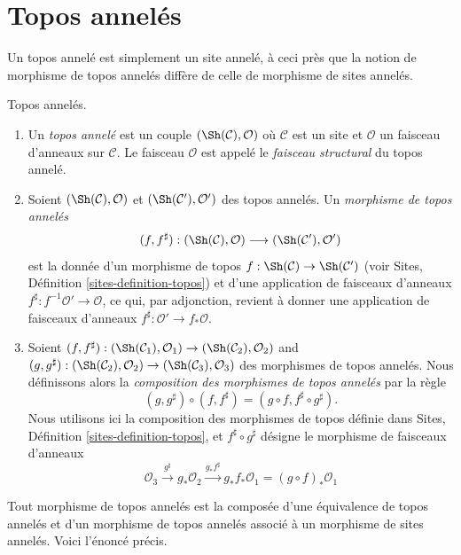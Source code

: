 \section{Topos annelés}
\label{section-ringed-topoi}

\noindent
Un topos annelé est simplement un site annelé, à ceci près que la notion de
morphisme de topos annelés diffère de celle de morphisme de sites annelés.

\begin{definition}
\label{definition-ringed-topos}
Topos annelés.
\begin{enumerate}
\item Un {\it topos annelé} est un couple
$(\Sh(\mathcal{C}), \mathcal{O})$
où $\mathcal{C}$ est un site et $\mathcal{O}$ un faisceau d'anneaux sur
$\mathcal{C}$. Le faisceau $\mathcal{O}$ est appelé le {\it faisceau
structural} du topos annelé.
\item Soient $(\Sh(\mathcal{C}), \mathcal{O})$ et
$(\Sh(\mathcal{C}'), \mathcal{O}')$ des topos annelés. Un {\it morphisme de
topos annelés}
$$
(f, f^\sharp) :
(\Sh(\mathcal{C}), \mathcal{O})
\longrightarrow
(\Sh(\mathcal{C}'), \mathcal{O}')
$$
est la donnée d'un morphisme de topos
$f : \Sh(\mathcal{C}) \to \Sh(\mathcal{C}')$ (voir Sites, Définition
\ref{sites-definition-topos}) et d'une application de faisceaux d'anneaux
$f^\sharp : f^{-1}\mathcal{O}' \to \mathcal{O}$, ce qui, par adjonction,
revient à donner une application de faisceaux d'anneaux
$f^\sharp : \mathcal{O}' \to f_*\mathcal{O}$.
\item Soient
$(f, f^\sharp) :
(\Sh(\mathcal{C}_1), \mathcal{O}_1)
\to (\Sh(\mathcal{C}_2), \mathcal{O}_2)$ and
$(g, g^\sharp) :
(\Sh(\mathcal{C}_2), \mathcal{O}_2) \to
(\Sh(\mathcal{C}_3), \mathcal{O}_3)$
des morphismes de topos annelés. Nous définissons alors la {\it composition des
morphismes de topos annelés} par la règle
$$
(g, g^\sharp) \circ (f, f^\sharp) = (g \circ f, f^\sharp \circ g^\sharp).
$$
Nous utilisons ici la composition des morphismes de topos définie dans Sites,
Définition \ref{sites-definition-topos}, et $f^\sharp \circ g^\sharp$ désigne
le morphisme de faisceaux d'anneaux
$$
\mathcal{O}_3 \xrightarrow{g^\sharp} g_*\mathcal{O}_2
\xrightarrow{g_*f^\sharp} g_*f_*\mathcal{O}_1 = (g \circ f)_*\mathcal{O}_1
$$
\end{enumerate}
\end{definition}

\noindent
Tout morphisme de topos annelés est la composée d'une équivalence de topos
annelés et d'un morphisme de topos annelés associé à un morphisme de sites
annelés. Voici l'énoncé précis.

